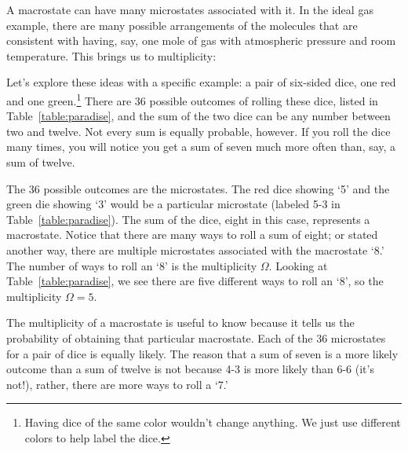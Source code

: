 
A macrostate can have many microstates associated with it.  In the
ideal gas example, there are many possible arrangements of the
molecules that are consistent with having, say, one mole of gas with
atmospheric pressure and room temperature.  This brings us to
multiplicity:


Let's explore these ideas with a specific example: a pair of six-sided
dice, one red and one green.\footnote{Having dice of the same color
  wouldn't change anything.  We just use different colors to help
  label the dice.}  There are 36 possible outcomes of rolling these
dice, listed in Table~\ref{table:paradise}, and the sum of the two
dice can be any number between two and twelve.  Not every sum is
equally probable, however.   If you roll the dice many times, you will
notice you get a sum of seven much more often than, say, a sum of
twelve.

The 36 possible outcomes are the microstates.  The red dice showing
`5' and the green die showing `3' would be a particular microstate
(labeled 5-3 in Table~\ref{table:paradise}).  The sum of the dice,
eight in this case, represents a macrostate.  Notice that there are
many ways to roll a sum of eight; or stated another way, there are
multiple microstates associated with the macrostate `8.'  The number
of ways to roll an `8' is the multiplicity $\Omega$.  Looking at
Table~\ref{table:paradise}, we see there are five different ways to
roll an `8', so the multiplicity $\Omega =5$.

The multiplicity of a macrostate is useful to know because it tells us
the probability of obtaining that particular macrostate.  Each of the
36 microstates for a pair of dice is equally likely.  The reason that
a sum of seven is a more likely outcome than a sum of twelve is not
because 4-3 is more likely than 6-6 (it's not!), rather, there are
more ways to roll a `7.'

